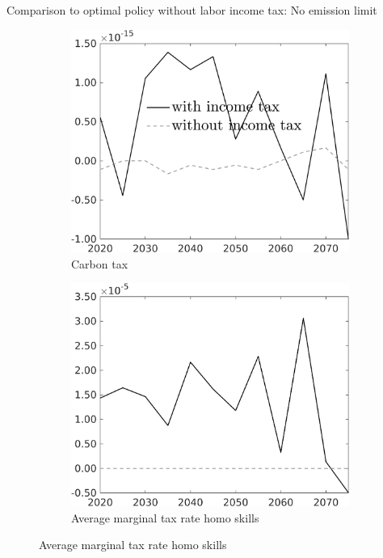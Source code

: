 \documentclass[11pt,aspectratio=169]{beamer}
\begin{document}
\begin{frame}{Comparison to optimal policy without labor income tax: No emission limit}
	\centering
	\begin{figure}[h!!]
		\centering
		\begin{subfigure}{0.32\textwidth}		
			\caption{Carbon tax}
			\includegraphics[width=1\textwidth]{../codding_model/own_basedOnFried/optimalPol_010922_revision/figures/all_13Sept22_Tplus30/tauf_OPT_NOT_NoTaus_COMPtaul_regime4_spillover0_knspil0_noskill0_sep0_xgrowth0_PV1_etaa0.79_lgd1.png}
		\end{subfigure}
		\begin{subfigure}{0.32\textwidth}		
			\caption{Average marginal tax rate homo skills}
			\includegraphics[width=1\textwidth]{../codding_model/own_basedOnFried/optimalPol_010922_revision/figures/all_13Sept22_Tplus30/dTaulAv_OPT_NOT_NoTaus_COMPtaul_regime4_spillover0_knspil0_noskill1_sep0_xgrowth0_PV1_etaa0.79_lgd0.png}

\end{subfigure}
\end{figure}
\end{frame}
\end{document}
